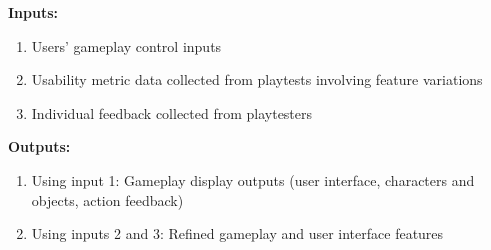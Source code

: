 \textbf{Inputs:}

\begin{enumerate}
	\item Users' gameplay control inputs
	\item Usability metric data collected from playtests involving feature 
	variations
	\item Individual feedback collected from playtesters
\end{enumerate}
	
\noindent \textbf{Outputs:}

\begin{enumerate}
	\item Using input 1: Gameplay display outputs (user interface, characters 
	and objects, action feedback)
	\item Using inputs 2 and 3: Refined gameplay and user interface features
\end{enumerate}